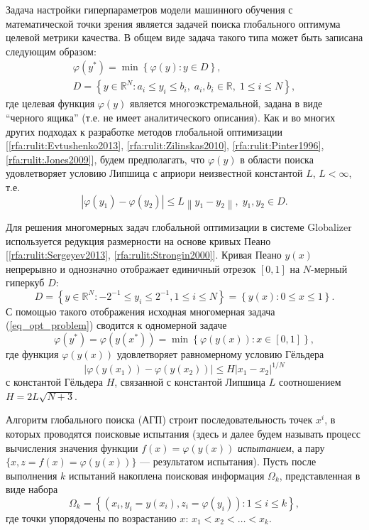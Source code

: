 \documentclass[10pt,a4paper]{book}
\begin{document}
Задача настройки гиперпараметров модели машинного обучения с математической точки зрения является задачей поиска глобального оптимума целевой метрики качества. В общем виде задача такого типа может быть записана следующим образом:
\begin{gather}
\varphi(y^\ast)=\min{\left\{\varphi(y):y\in D\right\}}, \label{eq_opt_problem}\\
D=\left\{y\in \mathbb{R}^N: a_i\leq y_i \leq b_i, \; a_i,b_i\in \mathbb{R}, \;  1\leq i \leq N\right\}, \label{eq_D}
\end{gather}
где целевая функция $\varphi(y)$ является многоэкстремальной, задана в виде ``черного ящика'' (т.е. не имеет аналитического описания). Как и во многих других подходах к разработке методов глобальной оптимизации [\ref{rfa:rulit:Evtushenko2013}, \ref{rfa:rulit:Zilinskas2010}, \ref{rfa:rulit:Pinter1996}, \ref{rfa:rulit:Jones2009}], будем предполагать, что $\varphi(y)$ в области поиска удовлетворяет условию Липшица с априори неизвестной константой $L$, $L<\infty$, т.е.
\[
\left|\varphi(y_1)-\varphi(y_2)\right|\leq L\left\|y_1-y_2\right\|,\; y_1,y_2 \in D.
\]

Для решения многомерных задач глобальной оптимизации в системе Globalizer используется редукция размерности на основе кривых Пеано [\ref{rfa:rulit:Sergeyev2013}, \ref{rfa:rulit:Strongin2000}]. Кривая Пеано $y(x)$ непрерывно и однозначно отображает единичный отрезок $[0,1]$ на $N$-мерный гиперкуб $D$:
\[
D = \left\{ y \in \mathbb{R}^N: -2^{-1} \leq y_i \leq 2^{-1}, 1 \leq i \leq N \right\} = \left\{ y(x): 0 \leq x \leq 1 \right\}.
\]
С помощью такого отображения исходная многомерная задача (\ref{eq_opt_problem}) сводится к одномерной задаче
\[
\varphi(y^\ast)=\varphi(y(x^\ast))=\min{\left\{\varphi(y(x)): x\in[0,1]\right\}},
\]
где функция $\varphi(y(x))$ удовлетворяет равномерному условию Гёльдера
\[
\left|\varphi(y(x_1))-\varphi(y(x_2))\right|\leq H\left|x_1-x_2\right|^{1/N}
\]
с константой Гёльдера $H$, связанной с константой Липшица $L$ соотношением $H = 2L\sqrt{N+3}$.

Алгоритм глобального поиска (АГП) строит последовательность точек $x^i$, в которых проводятся поисковые испытания (здесь и далее будем называть процесс вычисления значения функции $f(x)=\varphi(y(x))$ \textit{испытанием}, а пару $\{x, z = f(x) = \varphi(y(x))\}$ --- результатом испытания). Пусть после выполнения $k$ испытаний накоплена поисковая информация $\Omega_k$, представленная в виде набора
\[
\Omega_k = \left\{ (x_i, y_i = y(x_i), z_i = \varphi(y_i)) : 1 \leq i \leq k \right\},
\]
где точки упорядочены по возрастанию $x$: $x_1 < x_2 < \ldots < x_k$.
\end{document}
